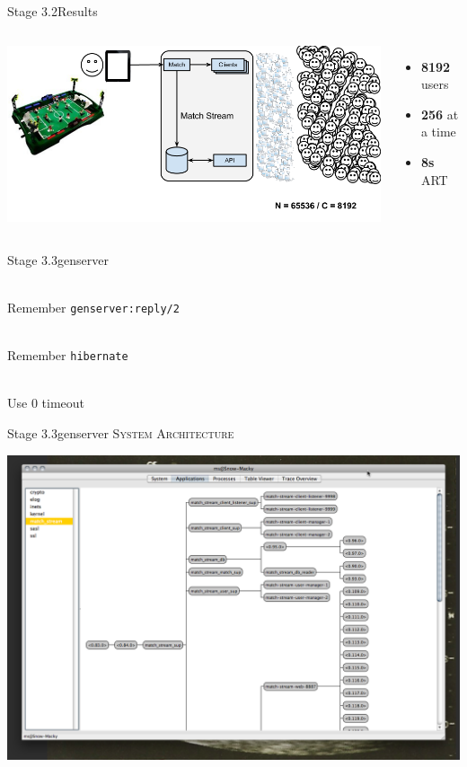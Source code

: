\documentclass[utf8]{beamer}
\begin{document}
\begin{frame}{Stage 3.2}{Results}
	\begin{columns}
			\includegraphics[top=-1,width=\textwidth]{img/MatchStream-3.png}
			\begin{itemize}
				\item \textbf{\Large 8192} users
				\item \textbf{\Large 256} at a time
				\item \textbf{\Large 8s} ART
			\end{itemize}
	\end{columns}
\end{frame}
\begin{frame}{Stage 3.3}{gen\textunderscore server}
	\begin{description}
		\item<+->[Call Timeouts]\ \\
			Remember \texttt{gen\textunderscore server:reply/2}
		\item<+->[Memory Footprint]\ \\
			Remember \texttt{hibernate}
		\item<+->[Long \texttt{init/1}]\ \\
			Use $0$ timeout
	\end{description}
\end{frame}
\begin{frame}{Stage 3.3}{gen\textunderscore server}
	\textsc{System Architecture}
	\begin{center}
		\includegraphics[height=.75\textheight]{img/running-late.png}
	\end{center}
\end{frame}
\end{document}
